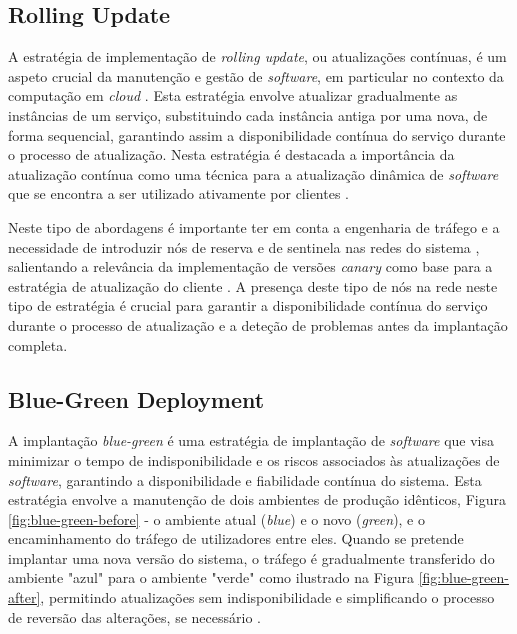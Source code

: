 \subsection{Rolling Update}

A estratégia de implementação de \textit{rolling update}, ou atualizações contínuas, é um aspeto 
crucial da manutenção e gestão de \textit{software}, em particular no contexto da computação em 
\textit{cloud} \cite{rolling2014}. Esta estratégia envolve atualizar gradualmente as instâncias de 
um serviço, substituindo cada instância antiga por uma nova, de forma sequencial, garantindo assim 
a disponibilidade contínua do serviço durante o processo de atualização. Nesta estratégia é destacada 
a importância da atualização contínua como uma técnica para a atualização dinâmica de \textit{software} 
que se encontra a ser utilizado ativamente por clientes \cite{rolling2014}. 

Neste tipo de abordagens é importante ter em conta a engenharia de tráfego e a necessidade de 
introduzir nós de reserva e de sentinela nas redes do sistema \cite{canary2022}, salientando a 
relevância da implementação de versões \textit{canary} como base para a estratégia de atualização 
do cliente \cite{canary2022}. A presença deste tipo de nós na rede neste tipo de estratégia é 
crucial para garantir a disponibilidade contínua do serviço durante o processo de atualização e a 
deteção de problemas antes da implantação completa.

\subsection{Blue-Green Deployment}

A implantação \textit{blue-green} é uma estratégia de implantação de \textit{software} que visa 
minimizar o tempo de indisponibilidade e os riscos associados às atualizações de \textit{software}, 
garantindo a disponibilidade e fiabilidade contínua do sistema. Esta estratégia envolve a
manutenção de dois ambientes de produção idênticos, Figura \ref{fig:blue-green-before} - o ambiente atual 
(\textit{blue}) e o novo (\textit{green}), e o encaminhamento do tráfego de utilizadores entre eles. 
Quando se pretende implantar uma nova versão do sistema, o tráfego é gradualmente transferido do 
ambiente "azul" para o ambiente "verde" como ilustrado na Figura \ref{fig:blue-green-after}, 
permitindo atualizações sem indisponibilidade e simplificando o processo de reversão das 
alterações, se necessário \cite{canary2022}.

